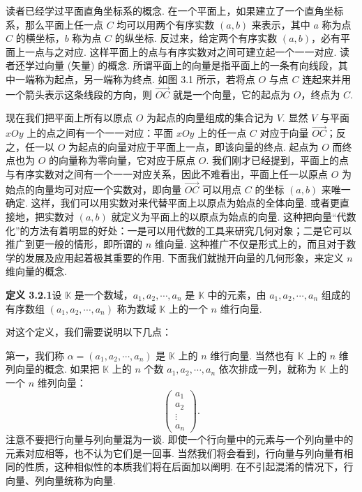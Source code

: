 \documentclass[UTF8,12pt,a4paper,fontset=fandol]{ctexart}
\begin{document}
读者已经学过平面直角坐标系的概念. 在一个平面上，如果建立了一个直角坐标系，那么平面上任一点 $C$ 均可以用两个有序实数 $(a,b)$ 来表示，其中 $a$ 称为点 $C$ 的横坐标，$b$ 称为点 $C$ 的纵坐标. 反过来，给定两个有序实数 $(a,b)$，必有平面上一点与之对应. 这样平面上的点与有序实数对之间可建立起一个一一对应. 读者还学过向量 (矢量) 的概念. 所谓平面上的向量是指平面上的一条有向线段，其中一端称为起点，另一端称为终点. 如图 3.1 所示，若将点 $O$ 与点 $C$ 连起来并用一个箭头表示这条线段的方向，则 $\overrightarrow{OC}$ 就是一个向量，它的起点为 $O$，终点为 $C$.

现在我们把平面上所有以原点 $O$ 为起点的向量组成的集合记为 $V$. 显然 $V$ 与平面 $xOy$ 上的点之间有一个一一对应：平面 $xOy$ 上的任一点 $C$ 对应于向量 $\overrightarrow{OC}$；反之，任一以 $O$ 为起点的向量对应于平面上一点，即该向量的终点. 起点为 $O$ 而终点也为 $O$ 的向量称为零向量，它对应于原点 $O$. 我们刚才已经提到，平面上的点与有序实数对之间有一个一一对应关系，因此不难看出，平面上任一以原点 $O$ 为始点的向量均可对应一个实数对，即向量 $\overrightarrow{OC}$ 可以用点 $C$ 的坐标 $(a,b)$ 来唯一确定. 这样，我们可以用实数对来代替平面上以原点为始点的全体向量. 或者更直接地，把实数对 $(a,b)$ 就定义为平面上的以原点为始点的向量. 这种把向量“代数化”的方法有着明显的好处：一是可以用代数的工具来研究几何对象；二是它可以推广到更一般的情形，即所谓的 $n$ 维向量. 这种推广不仅是形式上的，而且对于数学的发展及应用起着极其重要的作用. 下面我们就抛开向量的几何形象，来定义 $n$ 维向量的概念.

\noindent\textbf{定义 3.2.1}\quad 设 $\mathbb{K}$ 是一个数域，$a_1,a_2,\cdots,a_n$ 是 $\mathbb{K}$ 中的元素，由 $a_1,a_2,\cdots,a_n$ 组成的有序数组 $(a_1,a_2,\cdots,a_n)$ 称为数域 $\mathbb{K}$ 上的一个 $n$ 维行向量.

对这个定义，我们需要说明以下几点：

第一，我们称 $\alpha=(a_1,a_2,\cdots,a_n)$ 是 $\mathbb{K}$ 上的 $n$ 维行向量. 当然也有 $\mathbb{K}$ 上的 $n$ 维列向量的概念. 如果把 $\mathbb{K}$ 上的 $n$ 个数 $a_1,a_2,\cdots,a_n$ 依次排成一列，就称为 $\mathbb{K}$ 上的一个 $n$ 维列向量：
\[
\left(\begin{array}{c}
a_1\\
a_2\\
\vdots\\
a_n
\end{array}\right).
\]
注意不要把行向量与列向量混为一谈. 即使一个行向量中的元素与一个列向量中的元素对应相等，也不认为它们是一回事. 当然我们将会看到，行向量与列向量有相同的性质，这种相似性的本质我们将在后面加以阐明. 在不引起混淆的情况下，行向量、列向量统称为向量.
\end{document}
